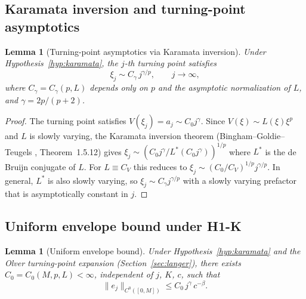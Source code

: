 \documentclass[12pt,a4paper]{amsart}
\newtheorem{lemma}[theorem]{Lemma}
\theoremstyle{definition}
\begin{document}
\subsection{Karamata inversion and turning-point asymptotics}

\begin{lemma}[Turning-point asymptotics via Karamata inversion]
\label{lem:karamata_inversion}
Under Hypothesis~\ref{hyp:karamata}, the $j$-th turning point satisfies
\begin{equation}\label{eq:tp_karamata}
  \xi_j \sim C_\gamma\,j^{\gamma/p},
  \qquad j\to\infty,
\end{equation}
where $C_\gamma = C_\gamma(p,L)$ depends only on $p$ and the
asymptotic normalization of $L$, and $\gamma = 2p/(p+2)$.
\end{lemma}

\begin{proof}
The turning point satisfies $V(\xi_j) = a_j\sim C_0 j^\gamma$.
Since $V(\xi)\sim L(\xi)\xi^p$ and $L$ is slowly varying,
the Karamata inversion theorem
(Bingham--Goldie--Teugels \cite{BGT1987}, Theorem~1.5.12)
gives $\xi_j \sim (C_0 j^\gamma / L^*(C_0 j^\gamma))^{1/p}$
where $L^*$ is the de Bruijn conjugate of $L$.
For $L\equiv C_V$ this reduces to $\xi_j\sim (C_0/C_V)^{1/p}j^{\gamma/p}$.
In general, $L^*$ is also slowly varying, so
$\xi_j \sim C_\gamma j^{\gamma/p}$ with a slowly varying
prefactor that is asymptotically constant in $j$.
\end{proof}

\subsection{Uniform envelope bound under H1-K}

\begin{lemma}[Uniform envelope bound]
\label{lem:uniform_envelope}
Under Hypothesis~\ref{hyp:karamata} and the Olver turning-point expansion
(Section~\ref{sec:langer}), there exists
$C_0 = C_0(M,p,L) < \infty$, independent of $j$, $K$, $c$, such that
\[
  \|e_j\|_{C^0([0,M])} \leq C_0\,j^\gamma\,c^{-\beta}.
\]
\end{lemma}
\end{document}
